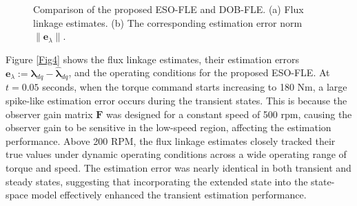\documentclass[conference]{IEEEtran}
\begin{document}
\begin{figure}[!t]
    \label{fig:subfig5-b}
    \caption{Comparison of the proposed ESO-FLE and DOB-FLE. (a) Flux linkage estimates. (b) The corresponding estimation error norm $ \| \boldsymbol{e}_{\lambda} \|$.}\label{Fig5}
\end{figure}
    
Figure \ref{Fig4} shows the flux linkage estimates, their estimation errors ${\boldsymbol{e}_{\lambda} := \boldsymbol{\lambda}_{dq} - \boldsymbol{\hat\lambda}_{dq}}$, and the operating conditions for the proposed ESO-FLE. At $t=0.05$  seconds, when the torque command starts increasing to 180 Nm, a large spike-like estimation error occurs during the transient states. This is because the observer gain matrix ${{\boldsymbol{F}}}$ was designed for a constant speed of 500 rpm, causing the observer gain to be sensitive in the low-speed region, affecting the estimation performance. Above 200 RPM, the flux linkage estimates closely tracked their true values under dynamic operating conditions across a wide operating range of torque and speed. The estimation error was nearly identical in both transient and steady states, suggesting that incorporating the extended state into the state-space model effectively enhanced the transient estimation performance.
\end{document}
